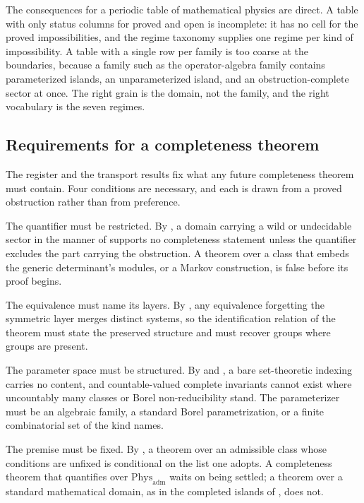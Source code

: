 \documentclass[11pt,letterpaper]{article}
\theoremstyle{definition}
\theoremstyle{remark}
\begin{document}
The consequences for a periodic table of mathematical physics are direct. A table with only status columns for proved and open is incomplete: it has no cell for the proved impossibilities, and the regime taxonomy supplies one regime per kind of impossibility. A table with a single row per family is too coarse at the boundaries, because a family such as the operator-algebra family contains parameterized islands, an unparameterized island, and an obstruction-complete sector at once. The right grain is the domain, not the family, and the right vocabulary is the seven regimes.

\subsection{Requirements for a completeness theorem}

The register and the transport results fix what any future completeness theorem must contain. Four conditions are necessary, and each is drawn from a proved obstruction rather than from preference.

The quantifier must be restricted. By , a domain carrying a wild or undecidable sector in the manner of  supports no completeness statement unless the quantifier excludes the part carrying the obstruction. A theorem over a class that embeds the generic determinant's modules, or a Markov construction, is false before its proof begins.

The equivalence must name its layers. By , any equivalence forgetting the symmetric layer merges distinct systems, so the identification relation of the theorem must state the preserved structure and must recover groups where groups are present.

The parameter space must be structured. By  and , a bare set-theoretic indexing carries no content, and countable-valued complete invariants cannot exist where uncountably many classes or Borel non-reducibility stand. The parameterizer must be an algebraic family, a standard Borel parametrization, or a finite combinatorial set of the kind  names.

The premise must be fixed. By , a theorem over an admissible class whose conditions are unfixed is conditional on the list one adopts. A completeness theorem that quantifies over $\mathrm{Phys}_{\mathrm{adm}}$ waits on  being settled; a theorem over a standard mathematical domain, as in the completed islands of , does not.
\end{document}
